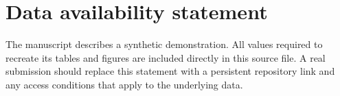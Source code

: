 \section*{Data availability statement}

The manuscript describes a synthetic demonstration. All values required to
recreate its tables and figures are included directly in this source file. A
real submission should replace this statement with a persistent repository link
and any access conditions that apply to the underlying data.
